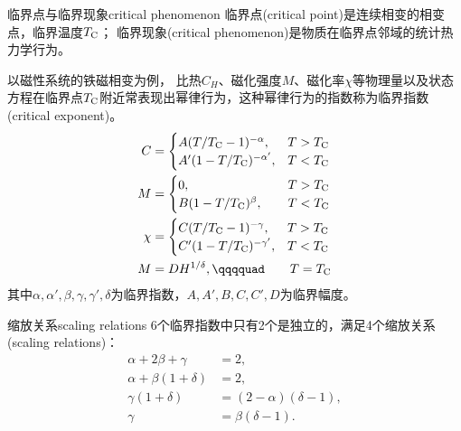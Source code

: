 \begin{definition}
	{临界点与临界现象}{critical phenomenon}
	临界点(critical point)是连续相变的相变点，临界温度$T_{\mathrm{C}}$；
	临界现象(critical phenomenon)是物质在临界点邻域的统计热力学行为。

	以磁性系统的铁磁相变为例，
	比热$C_H$、磁化强度$M$、磁化率$\chi$等物理量以及状态方程在临界点$T_{\mathrm{C}}$附近常表现出幂律行为，这种幂律行为的指数称为临界指数(critical exponent)。
	\begin{subequations}
		\begin{align}
			C&=\begin{cases}
				A(T/T_\crt-1)^{-\alpha}, & T>T_\crt \\
				A'(1-T/T_\crt)^{-\alpha'}, & T<T_\crt
			\end{cases}\\
			M&=\begin{cases}
				0, & T>T_\crt \\
				B(1-T/T_\crt)^{\beta},\phantom{\quad} & T<T_\crt
			\end{cases}\\
			\chi&=\begin{cases}
				C(T/T_\crt-1)^{-\gamma}, & T>T_\crt \\
				C'(1-T/T_\crt)^{-\gamma'}, & T<T_\crt
			\end{cases}\\
			M&=DH^{1/\delta},\qqqquad\qquad T=T_\crt
		\end{align}
	\end{subequations}
	其中$\alpha,\alpha',\beta,\gamma,\gamma',\delta$为临界指数，$A,A',B,C,C',D$为临界幅度。
\end{definition}

\begin{theorem}
	{缩放关系}{scaling relations}
	6个临界指数中只有2个是独立的，满足4个缩放关系(scaling relations)：
	\begin{subequations}
		\begin{align}
			\alpha+2\beta+\gamma&=2,\\
			\alpha+\beta(1+\delta)&=2,\\
			\gamma(1+\delta)&=(2-\alpha)(\delta-1),\\
			\gamma&=\beta(\delta-1).
		\end{align}
	\end{subequations}
\end{theorem}

